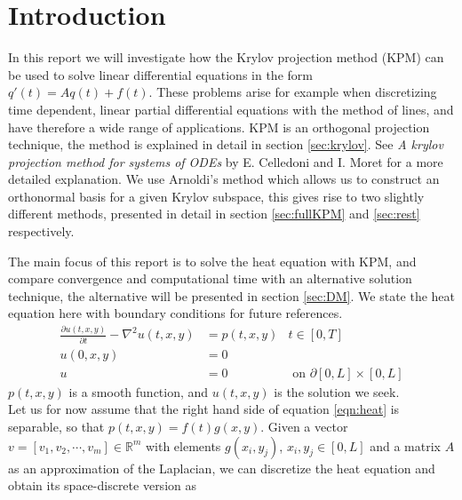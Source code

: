 \chapter{Introduction}%

In this report we will investigate how the Krylov projection method (KPM)  can be used to solve linear differential equations in the form $q'(t)=Aq(t)+f(t)$. These problems arise for example when discretizing time dependent, linear partial differential equations with the method of lines, and have therefore a wide range of applications. 
KPM is an orthogonal projection technique, the method is explained in detail in section \ref{sec:krylov}. See \textit{A krylov projection method for systems of ODEs} by E. Celledoni and I. Moret \cite{elena} for a more detailed explanation. We use Arnoldi's method which allows us to construct an orthonormal basis for a given Krylov subspace, this gives rise to two slightly different methods, presented in detail in section \ref{sec:fullKPM} and \ref{sec:rest} respectively.

The main focus of this report is to solve the heat equation with KPM, and compare convergence and computational time with an alternative solution technique, the alternative will be presented in section \ref{sec:DM}.
We state the heat equation here with boundary conditions for future references. \\
\begin{equation} \label{eqn:heat}
\begin{aligned}
\frac{\partial u(t,x,y)}{\partial t} - \nabla^2 u(t,x,y) &= p(t,x,y) & t \in [0,T]\\
u(0,x,y) &= 0 \\
u & = 0 			&\text{ on } \partial [0,L] \times [0,L]
\end{aligned}
\end{equation}
$p(t,x,y)$ is a smooth function, and $u(t,x,y)$ is the solution we seek.\\

Let us for now assume that the right hand side of equation \eqref{eqn:heat} is separable, so that $p(t,x,y) = f(t)g(x,y) $. 
Given a vector $v = [v_1,v_2, \cdots, v_m] \in \mathbb{R}^m $ with elements $ g(x_i,y_j)$, $x_i,y_j \in [0,L]$ and a matrix $A$ as an approximation of the Laplacian, we can discretize the heat equation and obtain its space-discrete version as


